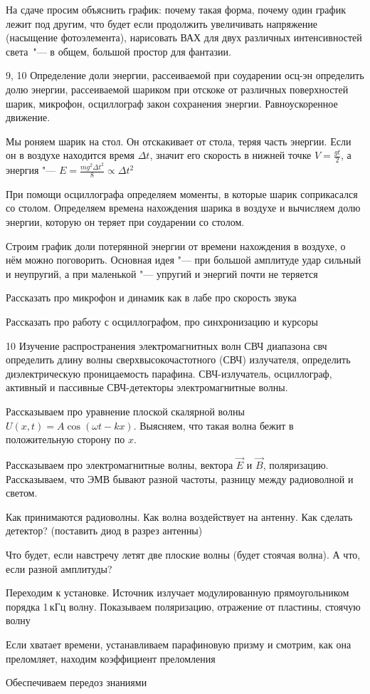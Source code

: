 \begin{enumerate}
{            На сдаче просим объяснить график: почему такая форма, почему один график лежит под другим, что будет если продолжить увеличивать напряжение (насыщение фотоэлемента), нарисовать ВАХ для двух различных интенсивностей света~"--- в общем, большой простор для фантазии.
        }
	\item \labtitle
		{9, 10}
		{Определение доли энергии, рассеиваемой при соударении}
		{осц-эн}
		{определить долю энергии, рассеиваемой шариком при отскоке от различных поверхностей}
		{шарик, микрофон, осциллограф}
		{закон сохранения энергии. Равноускоренное движение.}
		{\item Мы роняем шарик на стол. Он отскакивает от стола, теряя часть энергии. Если он в воздухе находится время $\Delta t$, значит его скорость в нижней точке $V=\frac{gt}{2}$, а энергия "--- $E=\frac{mg^2\Delta t^2}{8} \propto \Delta t^2$
		\item При помощи осциллографа определяем моменты, в которые шарик соприкасался со столом. Определяем времена нахождения шарика в воздухе и вычисляем долю энергии, которую он теряет при соударении со столом.
		\item Строим график доли потерянной энергии от времени нахождения в воздухе, о нём можно поговорить. Основная идея "--- при большой амплитуде удар сильный и неупругий, а при маленькой "--- упругий и энергий почти не теряется
		\item Рассказать про микрофон и динамик как в лабе про скорость звука
		\item Рассказать про работу с осциллографом, про синхронизацию и курсоры}
	\item \labtitle
		{10}
		{Изучение распространения электромагнитных волн СВЧ диапазона}
		{свч}
		{определить длину волны сверхвысокочастотного (СВЧ) излучателя, определить диэлектрическую проницаемость парафина.}
		{СВЧ-излучатель, осциллограф, активный и пассивные СВЧ-детекторы}
		{электромагнитные волны.}
		{\item Рассказываем про уравнение плоской скалярной волны $U(x, t) = A \cos(\omega t - kx)$. Выясняем, что такая волна бежит в положительную сторону по $x$.
		\item Рассказываем про электромагнитные волны, вектора $\vec E$ и $\vec B$, поляризацию. Рассказываем, что ЭМВ бывают разной частоты, разницу между радиоволной и светом.
		\item Как принимаются радиоволны. Как волна воздействует на антенну. Как сделать детектор? (поставить диод в разрез антенны)
		\item Что будет, если навстречу летят две плоские волны (будет стоячая волна). А что, если разной амплитуды?
		\item Переходим к установке. Источник излучает модулированную прямоугольником порядка 1\,кГц волну. Показываем поляризацию, отражение от пластины, стоячую волну
		\item Если хватает времени, устанавливаем парафиновую призму и смотрим, как она преломляет, находим коэффициент преломления
		\item Обеспечиваем передоз знаниями}
\end{enumerate}


